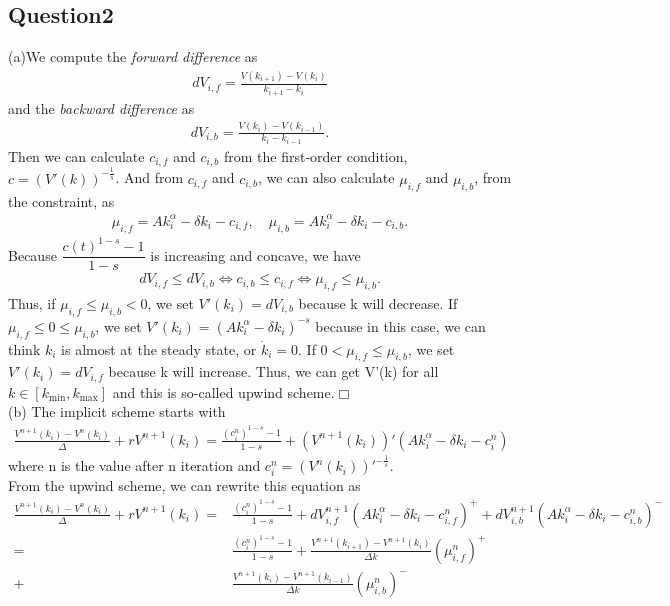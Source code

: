 \documentclass{article}
\begin{document}
\begin{CJK}{UTF8}{min}
\section*{Question2}
(a)\quad We compute the \emph{forward difference} as
\begin{align*}
dV_{i,f}=\frac{V(k_{i+1})-V(k_i)}{k_{i+1}-k_i}
\end{align*}
and the \emph{backward difference} as
\begin{align*}
dV_{i,b}=\frac{V(k_{i})-V(k_{i-1})}{k_{i}-k_{i-1}}.
\end{align*}
Then we can calculate $c_{i,f}$ and $c_{i,b}$ from the first-order condition, $c=(V'(k))^{-\frac1s}$. And from $c_{i,f}$ and $c_{i,b}$, we can also calculate $\mu_{i,f}$ and $\mu_{i,b}$, from the constraint, as
\begin{align*}
\mu_{i,f}=Ak_i^\alpha-\delta k_i-c_{i,f},\quad
\mu_{i,b}=Ak_i^\alpha-\delta k_i-c_{i,b}.
\end{align*}
Because $\dfrac{c(t)^{1-s}-1}{1-s}$ is increasing and concave, we have 
\begin{align*}
dV_{i,f}\leq dV_{i,b}\Leftrightarrow c_{i,b}\leq c_{i,f}\Leftrightarrow\mu_{i,f}\leq\mu_{i,b}.
\end{align*}
 Thus, if $\mu_{i,f}\leq\mu_{i,b}<0$, we set $V'(k_i)=dV_{i,b}$ because k will decrease. If $\mu_{i,f}\leq0\leq\mu_{i,b}$, we set
 $V'(k_i)=(Ak_i^\alpha-\delta k_i)^{-s}$ because in this case, we can think $k_i$ is almost at the steady state, or $\dot k_i=0$. If $0<\mu_{i,f}\leq\mu_{i,b}$, we set $V'(k_i)=dV_{i,f}$ because k will increase. Thus, we can get V'(k) for all $k\in[k_{\min},k_{\max}]$ and this is so-called upwind scheme.\quad$\Box $
\\(b)
The implicit scheme starts with 
\begin{align*}
\frac{V^{n+1}(k_i)-V^n(k_i)}{\Delta }+rV^{n+1}(k_i)=\frac{(c_i^n)^{1-s}-1}{1-s}+(V^{n+1}(k_i))'(Ak_i^\alpha-\delta k_i-c_i^n)
\end{align*}
where n is the value after n iteration and $c_i^n=(V^n(k_i))'^{-\frac1s}$.\\
From the upwind scheme, we can rewrite this equation as
\begin{align*}
\frac{V^{n+1}(k_i)-V^n(k_i)}{\Delta }+rV^{n+1}(k_i)=&\frac{(c_i^n)^{1-s}-1}{1-s}+dV_{i,f}^{n+1}(Ak_i^\alpha-\delta k_i-c_{i,f}^n)^++dV_{i,b}^{n+1}(Ak_i^\alpha-\delta k_i-c_{i,b}^n)^-\\
=&\frac{(c_i^n)^{1-s}-1}{1-s}+\frac{V^{n+1}(k_{i+1})-V^{n+1}(k_i)}{\Delta k}(\mu_{i,f}^n)^+\\+&\frac{V^{n+1}(k_{i})-V^{n+1}(k_{i-1})}{\Delta k}(\mu_{i,b}^n)^-\\

\end{align*}
\end{CJK}
\end{document}
